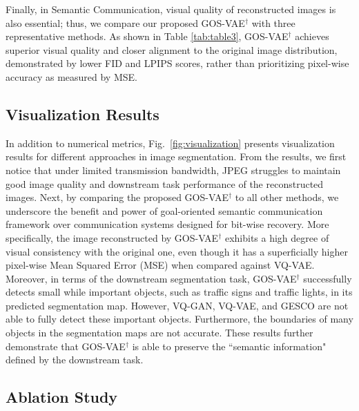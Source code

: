 Finally, in Semantic Communication, visual quality of reconstructed images is also essential; thus, we compare our proposed GOS-VAE$^{\dagger}$ with three representative methods. As shown in Table \ref{tab:table3}, GOS-VAE$^{\dagger}$ achieves superior visual quality and closer alignment to the original image distribution, demonstrated by lower FID and LPIPS scores, rather than prioritizing pixel-wise accuracy as measured by MSE.




\vspace{-1mm}
\subsection{Visualization Results}
\vspace{-1mm}
In addition to numerical metrics, Fig.~\ref{fig:visualization} presents visualization results for different approaches in image segmentation. From the results, we first notice that under limited transmission bandwidth, JPEG struggles to maintain good image quality and downstream task performance of the reconstructed images. Next, by comparing the proposed GOS-VAE$^{\dagger}$ to all other methods, we underscore the benefit and power of goal-oriented semantic communication framework over communication systems designed for bit-wise recovery. More specifically, the image reconstructed by GOS-VAE$^{\dagger}$ exhibits a high degree of visual consistency with the original one, even though it has a superficially higher pixel-wise Mean Squared Error (MSE) when compared against VQ-VAE. Moreover, in terms of the downstream segmentation task, GOS-VAE$^{\dagger}$ successfully detects small while important objects, such as traffic signs and traffic lights, in its predicted segmentation map. However, VQ-GAN, VQ-VAE, and GESCO are not able to fully detect these important objects. Furthermore, the boundaries of many objects in the segmentation maps are not accurate. These results further demonstrate that GOS-VAE$^{\dagger}$ is able to preserve the ``semantic information" defined by the downstream task.




\subsection{Ablation Study}
\vspace{-1mm}
